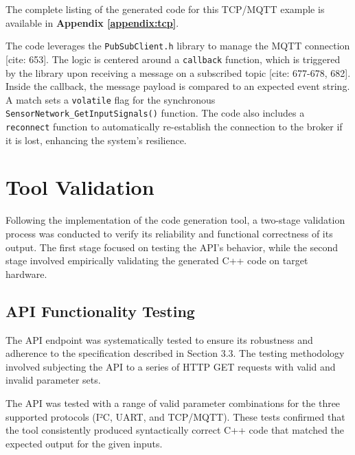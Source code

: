 The complete listing of the generated code for this TCP/MQTT example is available in \textbf{Appendix \ref{appendix:tcp}}.

The code leverages the \texttt{PubSubClient.h} library to manage the MQTT connection [cite: 653]. The logic is centered around a \texttt{callback} function, which is triggered by the library upon receiving a message on a subscribed topic [cite: 677-678, 682]. Inside the callback, the message payload is compared to an expected event string. A match sets a \texttt{volatile} flag for the synchronous \texttt{SensorNetwork\_GetInputSignals()} function. The code also includes a \texttt{reconnect} function to automatically re-establish the connection to the broker if it is lost, enhancing the system's resilience.



\section{Tool Validation}
\label{sec:validation}

Following the implementation of the code generation tool, a two-stage validation process was conducted to verify its reliability and functional correctness of its output. The first stage focused on testing the API's behavior, while the second stage involved empirically validating the generated C++ code on target hardware.

\subsection{API Functionality Testing}
\label{subsec:api_testing}

The API endpoint was systematically tested to ensure its robustness and adherence to the specification described in Section 3.3. The testing methodology involved subjecting the API to a series of HTTP GET requests with valid and invalid parameter sets.

The API was tested with a range of valid parameter combinations for the three supported protocols (I²C, UART, and TCP/MQTT). These tests confirmed that the tool consistently produced syntactically correct C++ code that matched the expected output for the given inputs.

